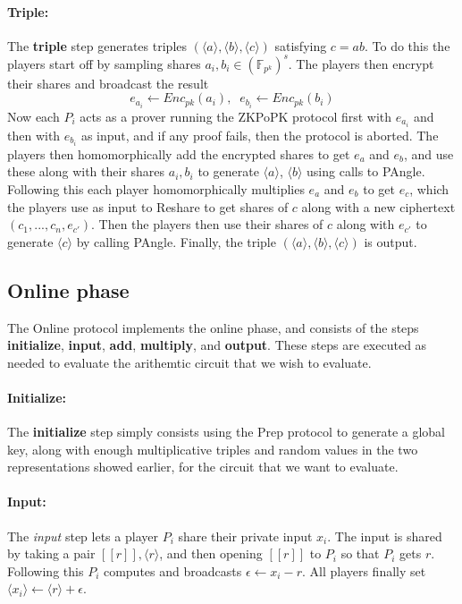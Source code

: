 \documentclass[../main.tex]{subfiles}
\begin{document}
\paragraph{Triple:}
The \textbf{triple} step generates triples $(\langle a \rangle, \langle b \rangle, \langle c \rangle)$ satisfying $c = ab$. To do this the players start off by sampling shares $a_i, b_i \in (\mathbb{F}_{p^k})^s$.
The players then encrypt their shares and broadcast the result $$e_{a_i} \leftarrow Enc_{pk}(a_i), \;\; e_{b_i} \leftarrow Enc_{pk}(b_i)$$
Now each $P_i$ acts as a prover running the ZKPoPK protocol first with $e_{a_i}$ and then with $e_{b_i}$ as input, and if any proof fails, then the protocol is aborted.
The players then homomorphically add the encrypted shares to get $e_a$ and $e_b$, and use these along with their shares $a_i, b_i$ to generate $\langle a \rangle$, $\langle b \rangle$ using calls to PAngle.
Following this each player homomorphically multiplies $e_a$ and $e_b$ to get $e_c$, which the players use as input to Reshare to get shares of $c$ along with a new ciphertext $(c_1, ..., c_n, e_{c'})$. Then the players then use their shares of $c$ along with $e_{c'}$ to generate $\langle c \rangle$ by calling PAngle. Finally, the triple $(\langle a \rangle, \langle b \rangle, \langle c \rangle)$ is output.


\subsection{Online phase} \label{subsection: Online}
The Online protocol implements the online phase,
and consists of the steps \textbf{initialize}, \textbf{input}, \textbf{add}, \textbf{multiply}, and \textbf{output}. These steps are executed as needed to evaluate the arithemtic circuit that we wish to evaluate.

\paragraph{Initialize:} The \textbf{initialize} step simply consists using the Prep protocol to generate a global key, along with enough multiplicative triples and random values in the two representations showed earlier, for the circuit that we want to evaluate.

\paragraph{Input:} The \textit{input} step lets a player $P_i$ share their private input $x_i$. The input is shared by taking a pair $[\![ r ]\!], \langle r \rangle$, and then opening $[\![ r ]\!]$ to $P_i$ so that $P_i$ gets $r$. Following this $P_i$ computes and broadcasts $\epsilon \leftarrow x_i - r$. All players finally set $\langle x_i \rangle \leftarrow \langle r \rangle + \epsilon$. %
\end{document}
